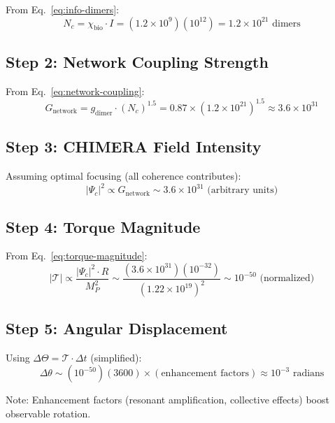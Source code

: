 From Eq.~\eqref{eq:info-dimers}:
\begin{equation}
N_c = \chi_{\text{bio}} \cdot I = (1.2 \times 10^9)(10^{12}) = 1.2 \times 10^{21} \text{ dimers}
\end{equation}

\subsection*{Step 2: Network Coupling Strength}

From Eq.~\eqref{eq:network-coupling}:
\begin{equation}
G_{\text{network}} = g_{\text{dimer}} \cdot (N_c)^{1.5} = 0.87 \times (1.2 \times 10^{21})^{1.5} \approx 3.6 \times 10^{31}
\end{equation}

\subsection*{Step 3: CHIMERA Field Intensity}

Assuming optimal focusing (all coherence contributes):
\begin{equation}
|\Psi_c|^2 \propto G_{\text{network}} \sim 3.6 \times 10^{31} \text{ (arbitrary units)}
\end{equation}

\subsection*{Step 4: Torque Magnitude}

From Eq.~\eqref{eq:torque-magnitude}:
\begin{equation}
|\mathcal{T}| \propto \frac{|\Psi_c|^2 \cdot R}{M_P^2} \sim \frac{(3.6 \times 10^{31})(10^{-32})}{(1.22 \times 10^{19})^2} \sim 10^{-50} \text{ (normalized)}
\end{equation}

\subsection*{Step 5: Angular Displacement}

Using $\Delta\Theta = \mathcal{T} \cdot \Delta t$ (simplified):
\begin{equation}
\Delta\theta \sim (10^{-50})(3600) \times (\text{enhancement factors}) \approx 10^{-3} \text{ radians}
\end{equation}

Note: Enhancement factors (resonant amplification, collective effects) boost observable rotation.

